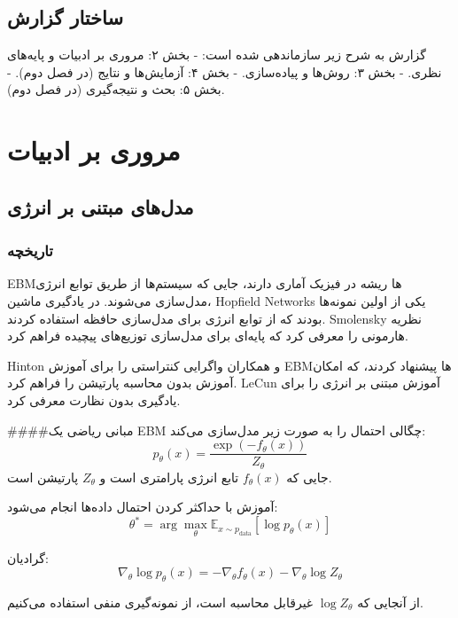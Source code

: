 \subsection{ساختار گزارش}
گزارش به شرح زیر سازماندهی شده است:
- بخش ۲: مروری بر ادبیات و پایه‌های نظری.
- بخش ۳: روش‌ها و پیاده‌سازی.
- بخش ۴: آزمایش‌ها و نتایج (در فصل دوم).
- بخش ۵: بحث و نتیجه‌گیری (در فصل دوم).

\section{مروری بر ادبیات}
\subsection{مدل‌های مبتنی بر انرژی}
\subsubsection{تاریخچه}
EBMها ریشه در فیزیک آماری دارند، جایی که سیستم‌ها از طریق توابع انرژی مدل‌سازی می‌شوند. در یادگیری ماشین، Hopfield Networks یکی از اولین نمونه‌ها بودند که از توابع انرژی برای مدل‌سازی حافظه استفاده کردند. Smolensky نظریه هارمونی را معرفی کرد که پایه‌ای برای مدل‌سازی توزیع‌های پیچیده فراهم کرد.

Hinton و همکاران واگرایی کنتراستی را برای آموزش EBMها پیشنهاد کردند، که امکان آموزش بدون محاسبه پارتیشن را فراهم کرد. LeCun آموزش مبتنی بر انرژی را برای یادگیری بدون نظارت معرفی کرد.

####مبانی ریاضی
یک EBM چگالی احتمال را به صورت زیر مدل‌سازی می‌کند:
\[
p_\theta(x) = \frac{\exp(-f_\theta(x))}{Z_\theta}
\]
جایی که \( f_\theta(x) \) تابع انرژی پارامتری است و \( Z_\theta \) پارتیشن است.

آموزش با حداکثر کردن احتمال داده‌ها انجام می‌شود:
\[
\theta^* = \arg\max_\theta \mathbb{E}_{x \sim p_{\text{data}}} [\log p_\theta(x)]
\]

گرادیان:
\[
\nabla_\theta \log p_\theta(x) = -\nabla_\theta f_\theta(x) - \nabla_\theta \log Z_\theta
\]

از آنجایی که \( \log Z_\theta \) غیرقابل محاسبه است، از نمونه‌گیری منفی استفاده می‌کنیم.

